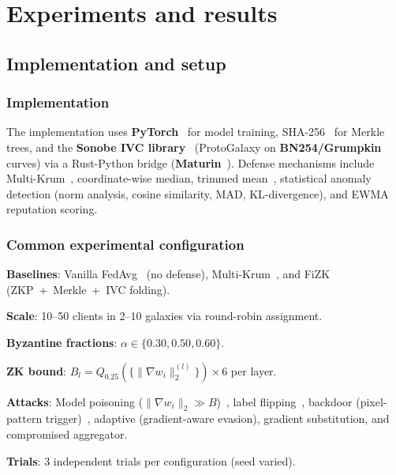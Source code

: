\documentclass[10pt,twocolumn,letterpaper]{article}
\begin{document}
\section{Experiments and results}
\label{sec:eval}

%                     
\subsection{Implementation and setup}
%                     

\subsubsection{Implementation}

The implementation uses \textbf{PyTorch}~\cite{paszke2019pytorch} for model training, SHA-256~\cite{nist2015sha} for Merkle trees, and the \textbf{Sonobe IVC library}~\cite{sonobe2024} (ProtoGalaxy on \textbf{BN254/Grumpkin} curves) via a Rust-Python bridge (\textbf{Maturin}~\cite{maturin2024}). Defense mechanisms include Multi-Krum~\cite{blanchard2017machine}, coordinate-wise median, trimmed mean~\cite{yin2018byzantine}, statistical anomaly detection (norm analysis, cosine similarity, MAD, KL-divergence), and EWMA reputation scoring.

\subsubsection{Common experimental configuration}

\textbf{Baselines}: Vanilla FedAvg~\cite{mcmahan2017communication} (no defense), Multi-Krum~\cite{blanchard2017machine}, and FiZK (ZKP~+~Merkle~+~IVC folding).

\textbf{Scale}: 10--50 clients in 2--10 galaxies via round-robin assignment.

\textbf{Byzantine fractions}: $\alpha \in \{0.30, 0.50, 0.60\}$.

\textbf{ZK bound}: $B_l = Q_{0.25}(\{\|\nabla w_i\|_2^{(l)}\}) \times 6$ per layer.

\textbf{Attacks}: Model poisoning ($\|\nabla w_i\|_2 \gg B$)~\cite{fang2020local}, label flipping~\cite{tolpegin2020data}, backdoor (pixel-pattern trigger)~\cite{gu2019badnets}, adaptive (gradient-aware evasion), gradient substitution, and compromised aggregator.

\textbf{Trials}: 3 independent trials per configuration (seed varied).
\end{document}
